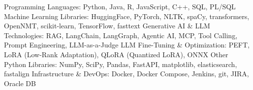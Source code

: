 \begin{cvskills}
  \cvskill
    {Programming Languages:}
    {Python, Java, R, JavaScript, C++, SQL, PL/SQL}
  \cvskill
    {Machine Learning Libraries:}
    {HuggingFace, PyTorch, NLTK, spaCy, transformers, OpenNMT, scikit-learn, TensorFlow, fasttext}
  \cvskill
    {Generative AI \& LLM Technologies:}
    {RAG, LangChain, LangGraph, Agentic AI, MCP, Tool Calling, Prompt Engineering, LLM-as-a-Judge}
  \cvskill
    {LLM Fine-Tuning \& Optimization:}
    {PEFT, LoRA (Low-Rank Adaptation), QLoRA (Quantized LoRA), ONNX}
  \cvskill
    {Other Python Libraries:}
    {NumPy, SciPy, Pandas, FastAPI, matplotlib, elasticsearch, fastalign}
  \cvskill
    {Infrastructure \& DevOps:}
    {Docker, Docker Compose, Jenkins, git, JIRA, Oracle DB}
\end{cvskills}